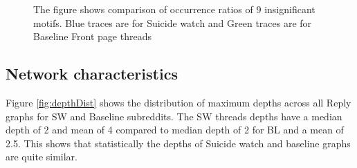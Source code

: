 \begin{figure}[!htb]
	
	\label{fig:MotifOccurance}
	\vspace{-0.4cm}
	\caption{ The figure shows comparison of occurrence ratios of 9 insignificant motifs. Blue traces are for Suicide watch and Green traces are for Baseline Front page threads}
	\vspace{-0.4cm}
\end{figure}


\subsection{Network characteristics}
Figure \ref{fig:depthDist} shows the distribution of maximum depths across all Reply graphs for SW and Baseline subreddits. The SW threads depths have a median depth of 2 and mean of 4 compared to median depth of 2 for BL and a mean of 2.5. This shows that statistically the depths of Suicide watch and baseline graphs are quite similar.

